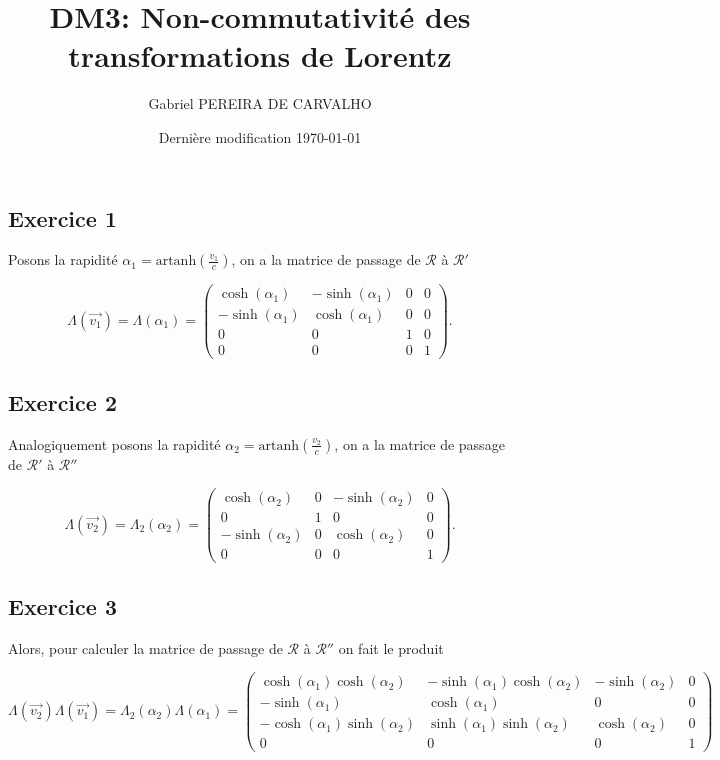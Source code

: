 \documentclass[french]{article}
\begin{document}
	\title{DM3: Non-commutativité des transformations de Lorentz}
	\author{Gabriel PEREIRA DE CARVALHO}
	\date{Dernière modification \today}
	
	\maketitle
	
	\subsection*{Exercice 1}
	
	Posons la rapidité $\alpha_1 = \mathrm{artanh}\left(\frac{v_1}{c}\right)$, on a la matrice de passage de $\mathcal{R}$ à $\mathcal{R}'$
	
	$$ \Lambda(\vec{v_1}) = \Lambda(\alpha_1) = \begin{pmatrix}
	\cosh(\alpha_1) & -\sinh(\alpha_1) & 0 & 0 \\
	-\sinh(\alpha_1) & \cosh(\alpha_1) & 0 & 0 \\
	0 & 0 & 1 & 0 \\
	0 & 0 & 0 & 1
	\end{pmatrix}.$$
	
	\subsection*{Exercice 2}
	
	Analogiquement posons la rapidité $\alpha_2 = \mathrm{artanh}\left(\frac{v_2}{c}\right)$, on a la matrice de passage de $\mathcal{R}'$ à $\mathcal{R}''$
	
	$$ \Lambda(\vec{v_2}) = \Lambda_2(\alpha_2) = \begin{pmatrix}
	\cosh(\alpha_2) & 0 &  -\sinh(\alpha_2) & 0 \\
	0 & 1 & 0 & 0 \\
	-\sinh(\alpha_2) & 0 & \cosh(\alpha_2) & 0 \\
	0 & 0 & 0 & 1
	\end{pmatrix}.$$
	
	\subsection*{Exercice 3}
	
	Alors, pour calculer la matrice de passage de $\mathcal{R}$ à $\mathcal{R}''$ on fait le produit
	
	$$ \Lambda(\vec{v_2}) \Lambda(\vec{v_1}) = \Lambda_2(\alpha_2) \Lambda(\alpha_1) = \begin{pmatrix}
	\cosh(\alpha_1)\cosh(\alpha_2) & -\sinh(\alpha_1)\cosh(\alpha_2) & -\sinh(\alpha_2) & 0 \\
	-\sinh(\alpha_1) & \cosh(\alpha_1) & 0 & 0 \\
	-\cosh(\alpha_1)\sinh(\alpha_2) & \sinh(\alpha_1)\sinh(\alpha_2) & \cosh(\alpha_2) & 0 \\
	0 & 0 & 0 & 1
	\end{pmatrix}
	$$
	
\end{document}
